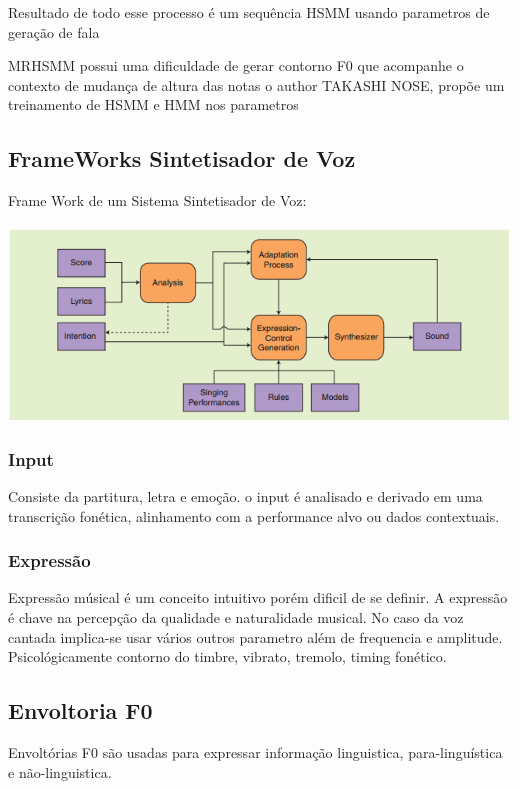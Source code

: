 		Resultado de todo esse processo é um sequência HSMM usando parametros de geração de fala
		
		MRHSMM possui uma dificuldade de gerar contorno F0 que acompanhe o contexto de mudança de altura das notas o author TAKASHI NOSE, propõe um treinamento de HSMM e HMM nos parametros 
		
	
	\subsection{FrameWorks Sintetisador de Voz}
	
		Frame Work de um Sistema Sintetisador de Voz:
		
		\includegraphics{frameWork.png}
		
		\subsubsection{Input}
		Consiste da partitura, letra e emoção.
		o input é analisado e derivado em uma transcrição fonética, alinhamento com a performance alvo ou dados contextuais.\cite{FrameWork}\linebreak
		
		\subsubsection{Expressão}
		Expressão músical é um conceito intuitivo porém dificil de se definir. A expressão é chave na percepção da qualidade e naturalidade musical.
		No caso da voz cantada implica-se usar vários outros parametro além de frequencia e amplitude. Psicológicamente contorno do timbre, vibrato, tremolo, timing fonético.\cite{FrameWork}\linebreak
	
	
	\subsection{Envoltoria F0}
	
	Envoltórias F0 são usadas para expressar informação linguistica, para-linguística e não-linguistica.\cite{SaitouF0}
	\linebreak
	
